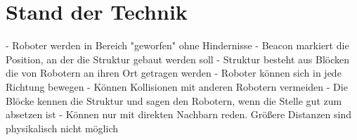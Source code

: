 \chapter{Stand der Technik}

- Roboter werden in Bereich "geworfen" ohne Hindernisse
- Beacon markiert die Position, an der die Struktur gebaut werden soll
- Struktur besteht aus Blöcken die von Robotern an ihren Ort getragen werden
- Roboter können sich in jede Richtung bewegen
- Können Kollisionen mit anderen Robotern vermeiden
- Die Blöcke kennen die Struktur und sagen den Robotern, wenn die Stelle gut zum absetzen ist
  - Können nur mit direkten Nachbarn reden. Größere Distanzen sind physikalisch nicht möglich
